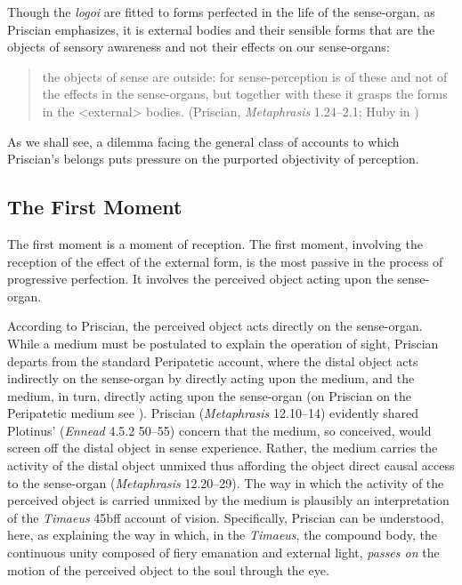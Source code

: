 \documentclass[12pt]{article}
\begin{document}
Though the \emph{logoi} are fitted to forms perfected in the life of the sense-organ, as Priscian emphasizes, it is external bodies and their sensible forms that are the objects of sensory awareness and not their effects on our sense-organs:
\begin{quote}
	the objects of sense are outside: for sense-perception is of these and not of the effects in the sense-organs, but together with these it grasps the forms in the <external> bodies. (Priscian, \emph{Metaphrasis} 1.24--2.1; Huby in \citealt[9]{Sorabji:1997ly})
\end{quote}
As we shall see, a dilemma facing the general class of accounts to which Priscian's belongs puts pressure on the purported objectivity of perception.

\subsection{The First Moment} %
\label{sub:the_first_moment}

The first moment is a moment of reception. The first moment, involving the reception of the effect of the external form, is the most passive in the process of progressive perfection. It involves the perceived object acting upon the sense-organ. 

According to Priscian, the perceived object acts directly on the sense-organ. While a medium must be postulated to explain the operation of sight, Priscian departs from the standard Peripatetic account, where the distal object acts indirectly on the sense-organ by directly acting upon the medium, and the medium, in turn, directly acting upon the sense-organ (on Priscian on the Peripatetic medium see \citealt{Ganson:2002aa}). Priscian (\emph{Metaphrasis} 12.10--14) evidently shared Plotinus' (\emph{Ennead} 4.5.2 50–55) concern that the medium, so conceived, would screen off the distal object in sense experience. Rather, the medium carries the activity of the distal object unmixed thus affording the object direct causal access to the sense-organ (\emph{Metaphrasis} 12.20--29). The way in which the activity of the perceived object is carried unmixed by the medium is plausibly an interpretation of the \emph{Timaeus} 45bff account of vision. Specifically, Priscian can be understood, here, as explaining the way in which, in the \emph{Timaeus}, the compound body, the continuous unity composed of fiery emanation and external light, \emph{passes on} the motion of the perceived object to the soul through the eye.
\end{document}
